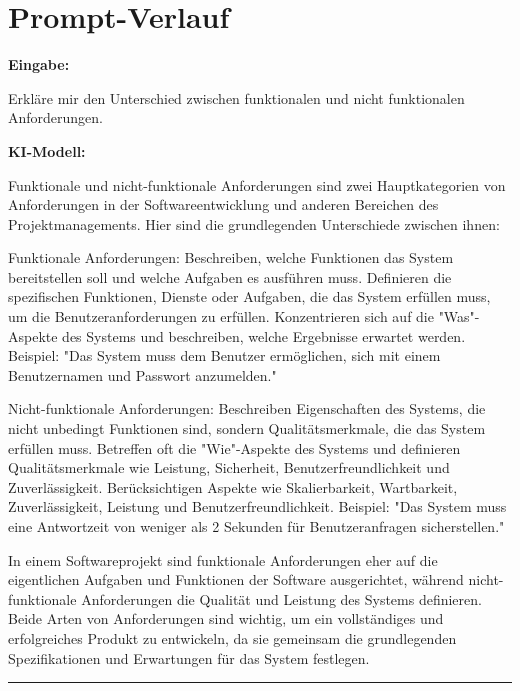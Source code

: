 \section{Prompt-Verlauf}

\textbf{Eingabe:} 

Erkläre mir den Unterschied zwischen funktionalen und nicht funktionalen Anforderungen.

\textbf{KI-Modell:} 

Funktionale und nicht-funktionale Anforderungen sind zwei Hauptkategorien von Anforderungen in der Softwareentwicklung und anderen Bereichen des Projektmanagements. Hier sind die grundlegenden Unterschiede zwischen ihnen:

Funktionale Anforderungen:
Beschreiben, welche Funktionen das System bereitstellen soll und welche Aufgaben es ausführen muss.
Definieren die spezifischen Funktionen, Dienste oder Aufgaben, die das System erfüllen muss, um die Benutzeranforderungen zu erfüllen.
Konzentrieren sich auf die "Was"-Aspekte des Systems und beschreiben, welche Ergebnisse erwartet werden.
Beispiel: "Das System muss dem Benutzer ermöglichen, sich mit einem Benutzernamen und Passwort anzumelden."

Nicht-funktionale Anforderungen:
Beschreiben Eigenschaften des Systems, die nicht unbedingt Funktionen sind, sondern Qualitätsmerkmale, die das System erfüllen muss.
Betreffen oft die "Wie"-Aspekte des Systems und definieren Qualitätsmerkmale wie Leistung, Sicherheit, Benutzerfreundlichkeit und Zuverlässigkeit.
Berücksichtigen Aspekte wie Skalierbarkeit, Wartbarkeit, Zuverlässigkeit, Leistung und Benutzerfreundlichkeit.
Beispiel: "Das System muss eine Antwortzeit von weniger als 2 Sekunden für Benutzeranfragen sicherstellen."

In einem Softwareprojekt sind funktionale Anforderungen eher auf die eigentlichen Aufgaben und Funktionen der Software ausgerichtet, während nicht-funktionale Anforderungen die Qualität und Leistung des Systems definieren. Beide Arten von Anforderungen sind wichtig, um ein vollständiges und erfolgreiches Produkt zu entwickeln, da sie gemeinsam die grundlegenden Spezifikationen und Erwartungen für das System festlegen.

\rule{\linewidth}{0.5pt}

